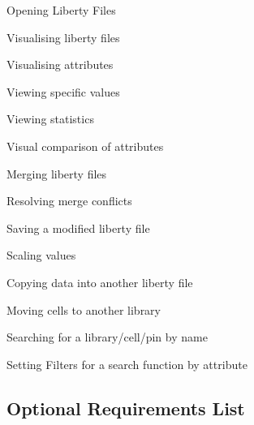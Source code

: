 \documentclass[10pt,a4paper]{report}
\begin{document}
\begin{FR}
    \item Opening Liberty Files \label{FR-1}
    \item Visualising liberty files \label{FR-2}
    \item Visualising attributes \label{FR-3}
    \item Viewing specific values \label{FR-4}
    \item Viewing statistics \label{FR-5}
    \item Visual comparison of attributes \label{FR-6}
    \item Merging liberty files \label{FR-7}
    \item Resolving merge conflicts \label{FR-8}
    \item Saving a modified liberty file \label{FR-9}
    \item Scaling values \label{FR-10}
    \item Copying data into another liberty file \label{FR-11}
    \item Moving cells to another library \label{FR-12}
    \item Searching for a library/cell/pin by name \label{FR-13}
    \item Setting Filters for a search function by attribute \label{FR-14}
\end{FR}
\subsection{Optional Requirements List}
\end{document}
